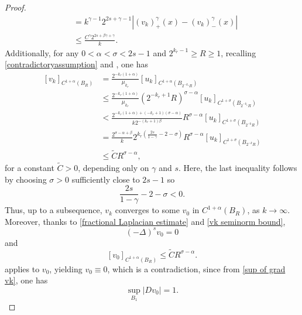 \documentclass[10pt,a4paper]{amsart}
\begin{document}
\begin{proof}
\begin{align}
    &=k^{\gamma-1}2^{2s+\gamma-1}\left|(v_k)_+^{\gamma}(x)-(v_k)_-^\gamma(x)\right|\nonumber\\
    &\le\frac{C^{\gamma}2^{2s+\beta\gamma+\gamma}}{k}.
    \end{align}    
    Additionally, for any $0<\alpha<\sigma<2s-1$ and $2^{k_r-1}\ge R\ge1$, recalling \eqref{contradictoryassumption} and , one has
    \begin{align}\label{vk seminorm bound}
        [v_k]_{C^{1+\alpha}(B_R)}&=\frac{2^{-k_r(1+\alpha)}}{\mu_{k_r}}[u_k]_{C^{1+\alpha}(B_{2^{-k_r}R})}\nonumber\\
        &\le\frac{2^{-k_r(1+\alpha)}}{\mu_{k_r}}(2^{-k_r+1}R)^{\sigma-\alpha}[u_k]_{C^{1+\sigma}(B_{2^{-k_r}R})}\nonumber\\   
        &<\frac{2^{-k_r(1+\alpha)+(-k_r+1)(\sigma-\alpha)}}{k2^{-(k_r+1)\beta}}R^{\sigma-\alpha}[u_k]_{C^{1+\sigma}(B_{2^{-k}R})}\nonumber\\
        &=\frac{2^{\sigma-\alpha+\beta}}{k}2^{k_r\left(\frac{2s}{1-\gamma}-2-\sigma\right)}R^{\sigma-\alpha}[u_k]_{C^{1+\sigma}(B_{2^{-k}R})}\nonumber\\
        &\le\tilde{C}R^{\sigma-\alpha},
    \end{align}
    for a constant $\tilde{C}>0$, depending only on $\gamma$ and $s$. Here, the last inequality follows by choosing $\sigma>0$ sufficiently close to $2s-1$ so
    $$
    \frac{2s}{1-\gamma}-2-\sigma<0.
    $$
    Thus, up to a subsequence, $v_k$ converges to some $v_0$ in $C^{1+\alpha}(B_R)$, as $k\to\infty$. Moreover, thanks to \eqref{fractional Laplacian estimate} and \eqref{vk seminorm bound},
    $$
    (-\Delta)^sv_0=0
    $$
    and
    $$
    [v_0]_{C^{1+\alpha}(B_R)}\le\tilde{C}R^{\sigma-\alpha}.
    $$
     applies to $v_0$, yielding $v_0\equiv0$, which is a contradiction, since from \eqref{sup of grad vk}, one has
    $$
    \sup_{B_{1}}|Dv_0|=1.
    $$
\end{proof}
\end{document}
